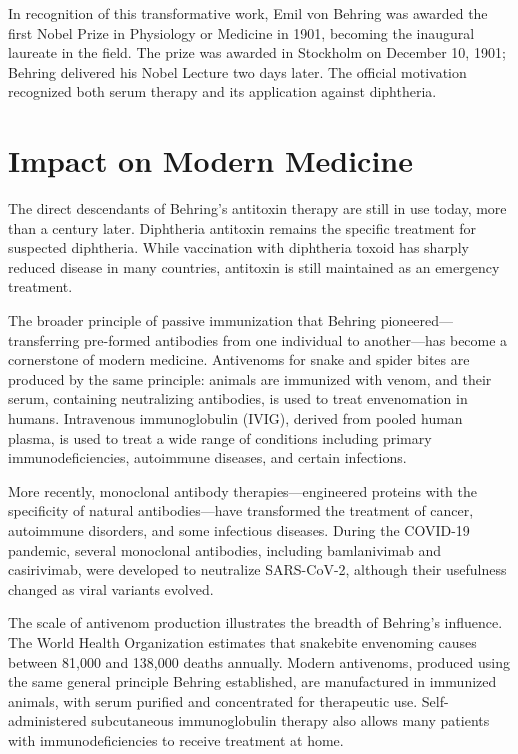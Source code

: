 In recognition of this transformative work, Emil von Behring was awarded the first Nobel Prize in Physiology or Medicine in 1901, becoming the inaugural laureate in the field. The prize was awarded in Stockholm on December 10, 1901; Behring delivered his Nobel Lecture two days later. The official motivation recognized both serum therapy and its application against diphtheria.\cite{nobel-1901,lecture-1901}

\section{Impact on Modern Medicine}

The direct descendants of Behring's antitoxin therapy are still in use today, more than a century later. Diphtheria antitoxin remains the specific treatment for suspected diphtheria. While vaccination with diphtheria toxoid has sharply reduced disease in many countries, antitoxin is still maintained as an emergency treatment.\cite{who-diphtheria}

The broader principle of passive immunization that Behring pioneered---transferring pre-formed antibodies from one individual to another---has become a cornerstone of modern medicine. Antivenoms for snake and spider bites are produced by the same principle: animals are immunized with venom, and their serum, containing neutralizing antibodies, is used to treat envenomation in humans. Intravenous immunoglobulin (IVIG), derived from pooled human plasma, is used to treat a wide range of conditions including primary immunodeficiencies, autoimmune diseases, and certain infections.

More recently, monoclonal antibody therapies---engineered proteins with the specificity of natural antibodies---have transformed the treatment of cancer, autoimmune disorders, and some infectious diseases. During the COVID-19 pandemic, several monoclonal antibodies, including bamlanivimab and casirivimab, were developed to neutralize SARS-CoV-2, although their usefulness changed as viral variants evolved.

The scale of antivenom production illustrates the breadth of Behring's influence. The World Health Organization estimates that snakebite envenoming causes between 81,000 and 138,000 deaths annually. Modern antivenoms, produced using the same general principle Behring established, are manufactured in immunized animals, with serum purified and concentrated for therapeutic use. Self-administered subcutaneous immunoglobulin therapy also allows many patients with immunodeficiencies to receive treatment at home.\cite{who-snakebite}

